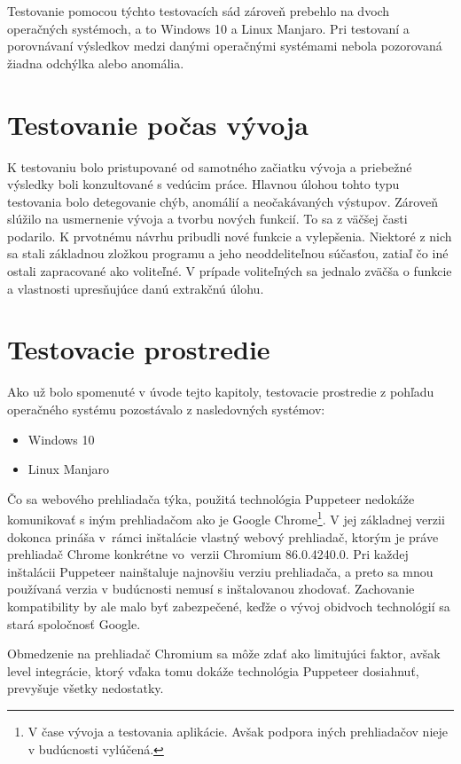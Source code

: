 Testovanie pomocou týchto testovacích sád zároveň prebehlo na dvoch operačných systémoch, a to Windows 10 a Linux Manjaro. Pri testovaní a porovnávaní výsledkov medzi danými operačnými systémami nebola pozorovaná žiadna odchýlka alebo anomália. 

\section{Testovanie počas vývoja}

K testovaniu bolo pristupované od samotného začiatku vývoja a priebežné výsledky boli konzultované s vedúcim práce. Hlavnou úlohou tohto typu testovania bolo detegovanie chýb, anomálií a neočakávaných výstupov. Zároveň slúžilo na usmernenie vývoja a tvorbu nových funkcií. To sa z väčšej časti podarilo. K prvotnému návrhu pribudli nové funkcie a vylepšenia. Niektoré z nich sa stali základnou zložkou programu a jeho neoddeliteľnou súčasťou, zatiaľ čo iné ostali zapracované ako voliteľné. V prípade voliteľných sa jednalo zväčša o funkcie a vlastnosti upresňujúce danú extrakčnú úlohu.

\section{Testovacie prostredie}

Ako už bolo spomenuté v úvode tejto kapitoly, testovacie prostredie z pohľadu operačného systému pozostávalo z nasledovných systémov:

\begin{itemize}
    \item Windows 10
    \item Linux Manjaro
\end{itemize}

\newpage

Čo sa webového prehliadača týka, použitá technológia Puppeteer nedokáže komunikovať s iným prehliadačom ako je Google Chrome\footnote{V čase vývoja a testovania aplikácie. Avšak podpora iných prehliadačov nieje v budúcnosti vylúčená.}. V jej základnej verzii dokonca prináša v~rámci inštalácie vlastný webový prehliadač, ktorým je práve prehliadač Chrome konkrétne vo~verzii Chromium 86.0.4240.0. Pri každej inštalácii Puppeteer nainštaluje najnovšiu verziu prehliadača, a preto sa mnou používaná verzia v budúcnosti nemusí s inštalovanou zhodovať. Zachovanie kompatibility by ale malo byť zabezpečené, keďže o vývoj obidvoch technológií sa stará spoločnosť Google.

Obmedzenie na prehliadač Chromium sa môže zdať ako limitujúci faktor, avšak level integrácie, ktorý vďaka tomu dokáže technológia Puppeteer dosiahnuť, prevyšuje všetky nedostatky.

